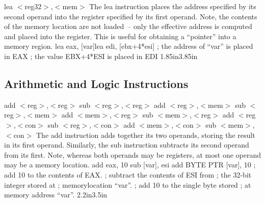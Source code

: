 {lea $<$reg32$>$,$<$mem$>$}
{The lea instruction places the address specified by its second
  operand into the register specified by its first operand. Note, the
  contents of the memory location are not loaded~-- only the effective
  address is computed and placed into the register.  This is useful
  for obtaining a ``pointer'' into a memory region.}
{lea eax, [var]\newline lea edi, [ebx+4*esi]}
{; the address of ``var'' is placed in EAX \newline
; the value EBX+4*ESI is placed in EDI}
{1.85in}{3.85in}

\subsection{Arithmetic and Logic Instructions}

{add $<$reg$>$,$<$reg$>$ \hspace{0.5in} sub $<$reg$>$,$<$reg$>$ \newline
add $<$reg$>$,$<$mem$>$ \hspace{0.5in} sub $<$reg$>$,$<$mem$>$ \newline
add $<$mem$>$,$<$reg$>$ \hspace{0.5in} sub $<$mem$>$,$<$reg$>$ \newline
add $<$reg$>$,$<$con$>$ \hspace{0.5in} sub $<$reg$>$,$<$con$>$ \newline
add $<$mem$>$,$<$con$>$ \hspace{0.5in} sub $<$mem$>$,$<$con$>$}
{The add instruction adds together its two operands, storing the
  result in its first operand. Similarly, the sub instruction
  subtracts its second operand from its first.  Note, whereas both
  operands may be registers, at most one operand may be a memory
  location.}
{add eax, 10\newline 
sub [var], esi\newline\newline\newline
add BYTE PTR [var], 10}
{; add 10 to the contents of EAX. \newline
; subtract the contents of ESI from \newline
; the 32-bit integer stored at \newline
; memorylocation ``var''.\newline
; add 10 to the single byte stored\newline
; at memory address ``var''.\newline}
{2.2in}{3.5in}

